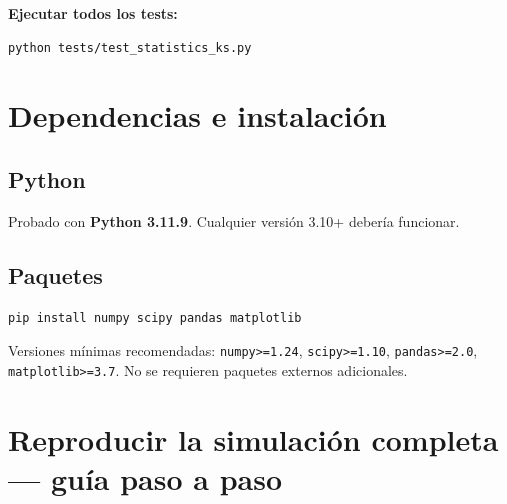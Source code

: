 \documentclass[11pt,a4paper]{article}
\begin{document}
\textbf{Ejecutar todos los tests:}
\begin{lstlisting}[style=shellstyle]
python tests/test_statistics_ks.py
\end{lstlisting}

\section{Dependencias e instalación}

\subsection{Python}
Probado con \textbf{Python 3.11.9}. Cualquier versión 3.10+ debería funcionar.

\subsection{Paquetes}
\begin{lstlisting}[style=shellstyle]
pip install numpy scipy pandas matplotlib
\end{lstlisting}

Versiones mínimas recomendadas: \texttt{numpy>=1.24}, \texttt{scipy>=1.10}, \texttt{pandas>=2.0}, \texttt{matplotlib>=3.7}. No se requieren paquetes externos adicionales.

\section{Reproducir la simulación completa --- guía paso a paso}
\end{document}
